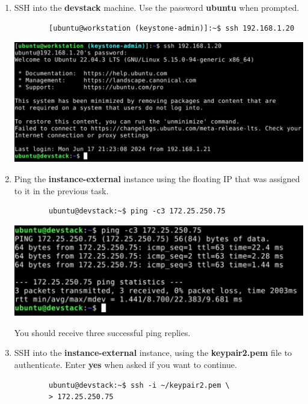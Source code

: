 \documentclass[letterpaper, 12pt]{article}
\begin{document}
\begin{enumerate}
    \item SSH into the \textbf{devstack} machine.
    Use the password \textbf{ubuntu} when prompted.
    \begin{lstlisting}
        [ubuntu@workstation (keystone-admin)]:~$ ssh 192.168.1.20
    \end{lstlisting}

    \begin{center}
        \includegraphics[width=\linewidth]{images/part6/step8.png}
    \end{center}

    \item Ping the \textbf{instance-external} instance using the floating IP that was assigned to it in the previous task.
    \begin{lstlisting}
        ubuntu@devstack:~$ ping -c3 172.25.250.75
    \end{lstlisting}

    \begin{center}
        \includegraphics[width=\linewidth]{images/part6/step9.png}
    \end{center}

    \begin{notebox}
        You should receive three successful ping replies.
    \end{notebox}

    \item SSH into the \textbf{instance-external} instance, using the \textbf{keypair2.pem} file to authenticate.
    Enter \textbf{yes} when asked if you want to continue.
    \begin{lstlisting}
        ubuntu@devstack:~$ ssh -i ~/keypair2.pem \
        > 172.25.250.75
    \end{lstlisting}


\end{enumerate}
\end{document}
